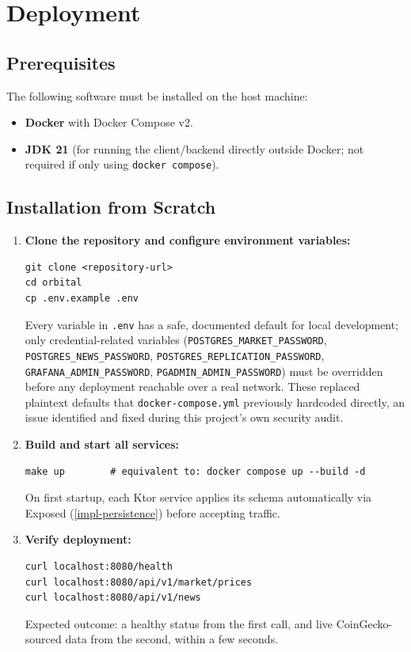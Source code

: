 \documentclass{scrartcl}
\begin{document}
\section{Deployment}\label{deployment}

\subsection{Prerequisites}\label{deployment-prerequisites}

The following software must be installed on the host machine:
\begin{itemize}
  \item \textbf{Docker} with Docker Compose v2.
  \item \textbf{JDK 21} (for running the client/backend directly outside Docker; not required if
  only using \texttt{docker compose}).
\end{itemize}

\subsection{Installation from Scratch}\label{deployment-installation}

\begin{enumerate}
  \item \textbf{Clone the repository and configure environment variables:}
\begin{verbatim}
git clone <repository-url>
cd orbital
cp .env.example .env
\end{verbatim}
  Every variable in \texttt{.env} has a safe, documented default for local development; only
  credential-related variables (\texttt{POSTGRES\_MARKET\_PASSWORD},
  \texttt{POSTGRES\_NEWS\_PASSWORD}, \texttt{POSTGRES\_REPLICATION\_PASSWORD},
  \texttt{GRAFANA\_ADMIN\_PASSWORD}, \texttt{PGADMIN\_ADMIN\_PASSWORD}) must be overridden before
  any deployment reachable over a real network. These replaced plaintext defaults that
  \texttt{docker-compose.yml} previously hardcoded directly, an issue identified and fixed during
  this project's own security audit.

  \item \textbf{Build and start all services:}
\begin{verbatim}
make up        # equivalent to: docker compose up --build -d
\end{verbatim}
  On first startup, each Ktor service applies its schema automatically via Exposed
  (\cref{impl-persistence}) before accepting traffic.

  \item \textbf{Verify deployment:}
\begin{verbatim}
curl localhost:8080/health
curl localhost:8080/api/v1/market/prices
curl localhost:8080/api/v1/news
\end{verbatim}
  Expected outcome: a healthy status from the first call, and live CoinGecko-sourced data from
  the second, within a few seconds.
\end{enumerate}
\end{document}
